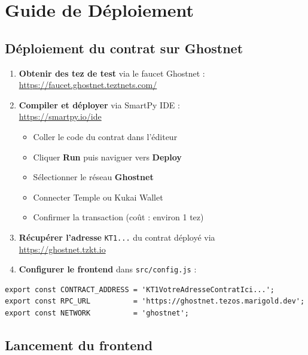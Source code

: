 \documentclass[12pt,a4paper]{article}
\begin{document}
\section{Guide de Déploiement}

\subsection{Déploiement du contrat sur Ghostnet}

\begin{enumerate}
  \item \textbf{Obtenir des tez de test} via le faucet Ghostnet :\\
    \url{https://faucet.ghostnet.teztnets.com/}

  \item \textbf{Compiler et déployer} via SmartPy IDE :\\
    \url{https://smartpy.io/ide}
    \begin{itemize}
      \item Coller le code du contrat dans l'éditeur
      \item Cliquer \textbf{Run} puis naviguer vers \textbf{Deploy}
      \item Sélectionner le réseau \textbf{Ghostnet}
      \item Connecter Temple ou Kukai Wallet
      \item Confirmer la transaction (coût : environ 1 tez)
    \end{itemize}

  \item \textbf{Récupérer l'adresse} \texttt{KT1...} du contrat déployé via\\
    \url{https://ghostnet.tzkt.io}

  \item \textbf{Configurer le frontend} dans \texttt{src/config.js} :
\end{enumerate}

\begin{lstlisting}[language=JSX, caption={Configuration src/config.js}]
export const CONTRACT_ADDRESS = 'KT1VotreAdresseContratIci...';
export const RPC_URL          = 'https://ghostnet.tezos.marigold.dev';
export const NETWORK          = 'ghostnet';
\end{lstlisting}

\subsection{Lancement du frontend}
\end{document}
